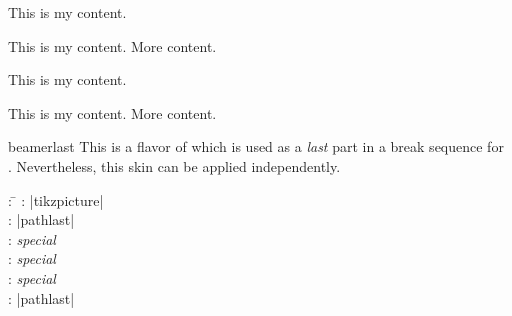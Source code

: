 \begin{dispExample}
\begin{tcbraster}[beamer,skin=beamermiddle,raster equal height,raster columns=4,
    colback=LightGreen,colframe=DarkGreen,
    left=1mm,right=1mm,top=1mm,bottom=1mm,middle=1mm]
  \begin{tcolorbox}
    This is my content.
  \end{tcolorbox}
  \begin{tcolorbox}
    This is my content.
    \tcblower
    More content.
  \end{tcolorbox}
  \begin{tcolorbox}[adjusted title=My title]
    This is my content.
  \end{tcolorbox}
  \begin{tcolorbox}[adjusted title=My title]
    This is my content.
    \tcblower
    More content.
  \end{tcolorbox}
\end{tcbraster}
\end{dispExample}


\clearpage
\begin{docSkin}{beamerlast}
This is a flavor of  which is used as a \emph{last} part
in a break sequence for .
Nevertheless, this skin can be applied independently.
\begin{tcolorbox}[skintable=beamerlast]
  \begin{tabbing}
    : \=\kill
    :  \> |tikzpicture|\\ 
    :           \> |pathlast|\\
    : \> \emph{special}\\ 
    :        \> \emph{special}\\
    :    \> \emph{special}\\
    :           \> |pathlast|
  \end{tabbing}
\end{tcolorbox}
\end{docSkin}

